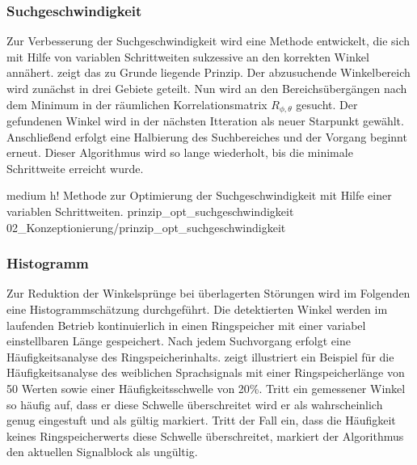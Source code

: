 \subsubsection{Suchgeschwindigkeit}
\label{subsubsec:Suchgeschwindigkeit}
Zur Verbesserung der Suchgeschwindigkeit wird eine Methode entwickelt, die sich mit Hilfe von variablen Schrittweiten sukzessive an den korrekten Winkel annähert.  zeigt das zu Grunde liegende Prinzip. Der abzusuchende Winkelbereich wird zunächst in drei Gebiete geteilt. Nun wird an den Bereichsübergängen nach dem Minimum in der räumlichen Korrelationsmatrix $R_{\phi, \theta}$ gesucht. Der gefundenen Winkel wird in der nächsten Itteration als neuer Starpunkt gewählt. Anschließend erfolgt eine Halbierung des Suchbereiches und der Vorgang beginnt erneut. Dieser Algorithmus wird so lange wiederholt, bis die minimale Schrittweite erreicht wurde. 

         {medium}                                                       %
         {h!}                                                  %
         {Methode zur Optimierung der Suchgeschwindigkeit mit Hilfe einer variablen Schrittweiten.}    %
         {prinzip_opt_suchgeschwindigkeit}                                               %
         {02_Konzeptionierung/prinzip_opt_suchgeschwindigkeit} 


\subsubsection{Histogramm}
\label{subsubsec:Histogramm}
Zur Reduktion der Winkelsprünge bei \zB überlagerten Störungen wird im Folgenden eine Histogrammschätzung durchgeführt. Die detektierten Winkel werden im laufenden Betrieb kontinuierlich in einen Ringspeicher mit einer variabel einstellbaren Länge gespeichert. Nach jedem Suchvorgang erfolgt eine Häufigkeitsanalyse des Ringspeicherinhalts.  zeigt illustriert ein Beispiel für die Häufigkeitsanalyse des weiblichen Sprachsignals mit einer Ringspeicherlänge von 50 Werten sowie einer Häufigkeitsschwelle von 20\%. Tritt ein gemessener Winkel so häufig auf, dass er diese Schwelle überschreitet wird er als wahrscheinlich genug eingestuft und als gültig markiert. Tritt der Fall ein, dass die Häufigkeit keines Ringspeicherwerts diese Schwelle überschreitet, markiert der Algorithmus den aktuellen Signalblock als ungültig.



